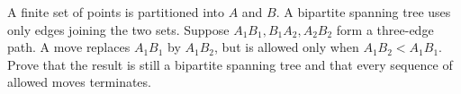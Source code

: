 A finite set of points is partitioned into $A$ and $B$. A bipartite spanning tree uses only edges joining the two sets. Suppose $A_1B_1,B_1A_2,A_2B_2$ form a three-edge path. A move replaces $A_1B_1$ by $A_1B_2$, but is allowed only when $A_1B_2<A_1B_1$. Prove that the result is still a bipartite spanning tree and that every sequence of allowed moves terminates.
